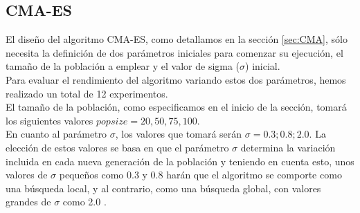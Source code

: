 \newpage
\subsection{CMA-ES}\label{sec:paramCMA_ES}

El diseño del algoritmo CMA-ES, como detallamos en la sección \ref{sec:CMA}, sólo necesita la definición de dos parámetros iniciales para comenzar su ejecución, el tamaño de la población a emplear y el valor de sigma ($\sigma$) inicial. \\ Para evaluar el rendimiento del algoritmo variando estos dos parámetros, hemos realizado un total de 12 experimentos. \\

El tamaño de la población, como especificamos en el inicio de la sección, tomará los siguientes valores $popsize = 20, 50, 75, 100$. \\
En cuanto al parámetro $\sigma$, los valores que tomará serán $\sigma = 0.3; 0.8; 2.0$. La elección de estos valores se basa en que el parámetro $\sigma$ determina la variación incluida en cada nueva generación de la población y teniendo en cuenta esto, unos valores de $\sigma$ pequeños como 0.3 y 0.8 harán que el algoritmo se comporte como una búsqueda local, y al contrario, como una búsqueda global, con valores grandes de $\sigma$ como 2.0 \cite{CMA1}. \\

